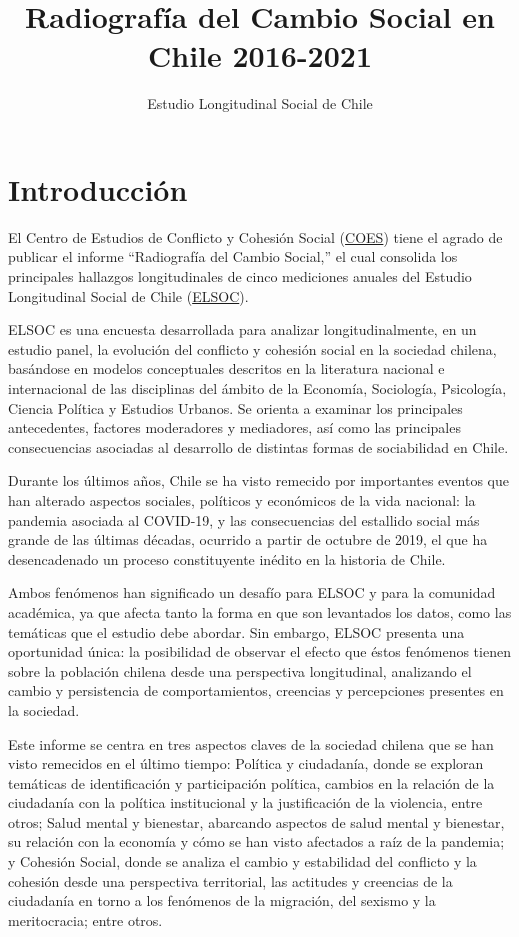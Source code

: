 \documentclass[
  12pt,
]{book}
\title{Radiografía del Cambio Social en Chile 2016-2021}
\subtitle{Estudio Longitudinal Social de Chile}
\author{}
\date{\vspace{-2.5em}}
\begin{document}
\maketitle

{
\hypersetup{linkcolor=}
\setcounter{tocdepth}{1}
\tableofcontents
}
\listoftables
\listoffigures
{}
\hypertarget{introducciuxf3n}{%
\chapter*{Introducción}\label{introducciuxf3n}}

El Centro de Estudios de Conflicto y Cohesión Social (\href{https://coes.cl/}{COES}) tiene el agrado de publicar el informe ``Radiografía del Cambio Social,'' el cual consolida los principales hallazgos longitudinales de cinco mediciones anuales del Estudio Longitudinal Social de Chile (\href{https://coes.cl/encuesta-panel/}{ELSOC}).

ELSOC es una encuesta desarrollada para analizar longitudinalmente, en un estudio panel, la evolución del conflicto y cohesión social en la sociedad chilena, basándose en modelos conceptuales descritos en la literatura nacional e internacional de las disciplinas del ámbito de la Economía, Sociología, Psicología, Ciencia Política y Estudios Urbanos. Se orienta a examinar los principales antecedentes, factores moderadores y mediadores, así como las principales consecuencias asociadas al desarrollo de distintas formas de sociabilidad en Chile.

Durante los últimos años, Chile se ha visto remecido por importantes eventos que han alterado aspectos sociales, políticos y económicos de la vida nacional: la pandemia asociada al COVID-19, y las consecuencias del estallido social más grande de las últimas décadas, ocurrido a partir de octubre de 2019, el que ha desencadenado un proceso constituyente inédito en la historia de Chile.

Ambos fenómenos han significado un desafío para ELSOC y para la comunidad académica, ya que afecta tanto la forma en que son levantados los datos, como las temáticas que el estudio debe abordar. Sin embargo, ELSOC presenta una oportunidad única: la posibilidad de observar el efecto que éstos fenómenos tienen sobre la población chilena desde una perspectiva longitudinal, analizando el cambio y persistencia de comportamientos, creencias y percepciones presentes en la sociedad.

Este informe se centra en tres aspectos claves de la sociedad chilena que se han visto remecidos en el último tiempo: Política y ciudadanía, donde se exploran temáticas de identificación y participación política, cambios en la relación de la ciudadanía con la política institucional y la justificación de la violencia, entre otros; Salud mental y bienestar, abarcando aspectos de salud mental y bienestar, su relación con la economía y cómo se han visto afectados a raíz de la pandemia; y Cohesión Social, donde se analiza el cambio y estabilidad del conflicto y la cohesión desde una perspectiva territorial, las actitudes y creencias de la ciudadanía en torno a los fenómenos de la migración, del sexismo y la meritocracia; entre otros.
\end{document}
